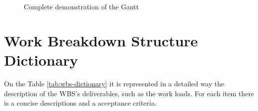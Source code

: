 \begin{figure}
    \centering
    \caption{Complete demonstration of the Gantt}
    \label{fig:gantt_complete}
\end{figure}

\section{Work Breakdown Structure Dictionary}

On the Table \ref{tab:wbs-dictionary} it is represented in a detailed way the description of the \gls{WBS}'s deliverables, such as the work loads. For each item there is a concise descriptions and a acceptance criteria.


